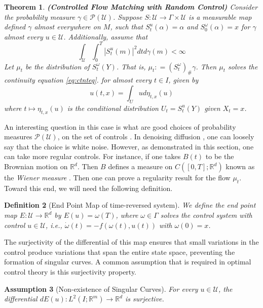 \documentclass{article}
\newtheorem{theorem}{Theorem}[section]
\newtheorem{definition}[theorem]{Definition}
\newtheorem{assumption}[theorem]{Assumption}
\newcommand{\Rd}{\mathbb{R}^d}
\begin{document}
\begin{theorem}
   \label{thm:randcongr}
    \textbf{(Controlled Flow Matching with Random Control)}
Consider the probability measure $\gamma \in \mathcal{P}(\mathcal{U})$. Suppose $S: \mathcal{U} \rightarrow \Gamma \times \mathcal{U}$ is a measurable map defined $\gamma$ almost everywhere on $M$, such that $S^u_t(\alpha) = \alpha$ and $S^{\omega}_0(\alpha) = x$ for $\gamma$ almost every $u \in \mathcal{U}$.
Additionally, assume that 
\begin{equation}
\label{eq:finengy}
\int_{\mathcal{U}}\int_{0}^T |S^u_t(m)|^2dt d\gamma(m) <\infty
\end{equation}
Let $\mu_t$ be the distribution of $S^{\omega}_t(Y)$.
That is, $\mu_t : = (S^{\omega}_t)_{\#} \gamma$. Then $\mu_t$ solves the continuity equation \eqref{eq:ctnteq}.  for almost every $t \in I$, given by
\[u(t,x) = \int_{U} u d\eta_{t,x}(u)\]
where $t \mapsto \eta_{t,x}(u)$ is the conditional distribution  $U_t = S^u_t(Y)$ given $X_t = x$.
\end{theorem}

An interesting question in this case is what are good choices of probability measures $\mathcal{P}(\mathcal{U})$, on the set of controls . In denoising diffusion \cite{song2020score}, one can loosely say that the choice is white noise. However, as demonstrated in this section, one can take more regular controls. For instance, if one takes $B(t)$ to be the Brownian motion on $\Rd$. Then $B$ defines a measure on $C([0,T];\Rd)$ known as the {\it Wiener measure} \cite{bogachev2010differentiable}.  Then one can prove a regularity result for the flow $\mu_t$. Toward this end, we will need the following definition.

\begin{definition}[End Point Map of time-reversed system]
\label{def:endpoint}
We define the end point map $E: \mathcal{U} \rightarrow \mathbb{R}^d$ by $E(u) = \omega(T)$, where $\omega \in \Gamma$ solves the control system with control $u \in \mathcal{U}$, i.e., $\dot{\omega}(t) = -f(\omega(t), u(t))$ with $\omega(0) = x$.
\end{definition}

The surjectivity of the differential of this map ensures that small variations in the control produce variations that span the entire state space, preventing the formation of singular curves. A common assumption that is required in optimal control theory is this surjectivity property.

\begin{assumption}[Non-existence of Singular Curves]
\label{asmp:nonsingular}
For every $u \in \mathcal{U}$, the differential $dE(u): L^2(I; \mathbb{R}^m) \rightarrow \mathbb{R}^d$ is surjective.
\end{assumption}
\end{document}
